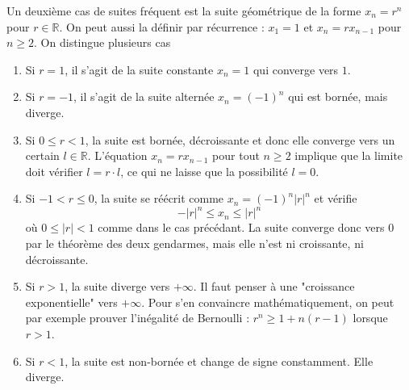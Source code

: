 Un deuxième cas de suites fréquent est la suite géométrique de la forme $x_n = r^n$ pour $r \in \mathbb R$. On peut aussi la définir par récurrence : $x_1 = 1$ et $x_{n} = r x_{n-1}$ pour $n \geq 2$. On distingue plusieurs cas

\begin{enumerate}
    \item Si $r = 1$, il s'agit de la suite constante $x_n = 1$ qui converge vers $1$.
    \item Si $r = -1$, il s'agit de la suite alternée $x_n = (-1)^n$ qui est bornée, mais diverge.
    \item Si $0 \leq r < 1$, la suite est bornée, décroissante et donc elle converge vers un certain $l \in \mathbb R$. L'équation $x_n = r x_{n-1}$ pour tout $n \geq 2$ implique que la limite doit vérifier $l = r \cdot l$, ce qui ne laisse que la possibilité $l = 0$.
    \item Si $-1 < r \leq 0$, la suite se réécrit comme $x_n = (-1)^n |r|^n$ et vérifie
    $$-|r|^n \leq x_n \leq |r|^n$$
    où $0 \leq |r| < 1$ comme dans le cas précédant. La suite converge donc vers $0$ par le théorème des deux gendarmes, mais elle n'est ni croissante, ni décroissante.
    \item Si $r > 1$, la suite diverge vers $+\infty$. Il faut penser à une "croissance exponentielle" vers $+\infty$. Pour s'en convaincre mathématiquement, on peut par exemple prouver l'inégalité de Bernoulli : $r^n \geq 1 + n(r-1)$ lorsque $r > 1$.
    \item Si $r < 1$, la suite est non-bornée et change de signe constamment. Elle diverge. 
\end{enumerate}
